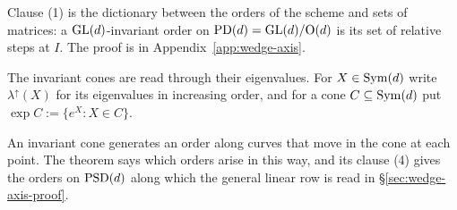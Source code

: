 Clause (1) is the dictionary between the orders of the scheme and sets of matrices: a
$\mathrm{GL}(d)$-invariant order on $\mathrm{PD}(d) = \mathrm{GL}(d)/\mathrm{O}(d)$ is its set of relative steps at $I$.
The proof is in Appendix~\ref{app:wedge-axis}.

The invariant cones are read through their eigenvalues. For $X \in \mathrm{Sym}(d)$ write
$\lambda^\uparrow(X)$ for its eigenvalues in increasing order, and for a cone $C \subseteq \mathrm{Sym}(d)$
put $\exp C := \{e^X : X \in C\}$.

An invariant cone generates an order along curves that move in the cone at each point. The theorem
says which orders arise in this way, and its clause (4) gives the orders on $\mathrm{PSD}(d)$ along which the
general linear row is read in \S\ref{sec:wedge-axis-proof}.

